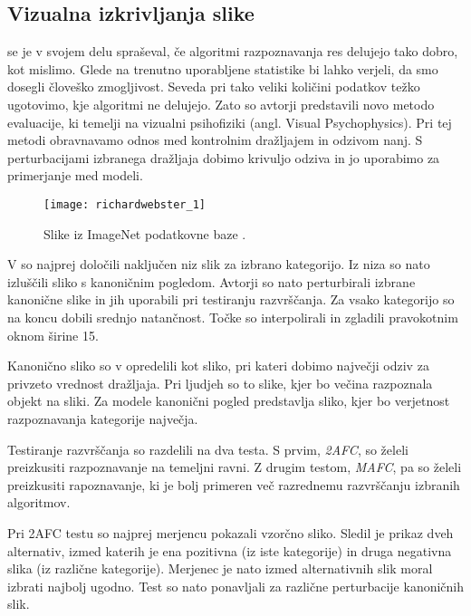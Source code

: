 \subsection{Vizualna izkrivljanja slike} \label{sec:psihofizika}
 se je v svojem delu spraševal, če algoritmi razpoznavanja res delujejo tako dobro, kot mislimo. Glede na trenutno uporabljene statistike bi lahko verjeli, da smo dosegli človeško zmogljivost. Seveda pri tako veliki količini podatkov težko ugotovimo, kje algoritmi ne delujejo. Zato so avtorji predstavili novo metodo evaluacije, ki temelji na vizualni psihofiziki (angl. Visual Psychophysics). Pri tej metodi obravnavamo odnos med kontrolnim dražljajem in odzivom nanj. S perturbacijami izbranega dražljaja dobimo krivuljo odziva in jo uporabimo za primerjanje med modeli. 


\begin{figure}[!htbp]
	\centering
	\texttt{[image: richardwebster\_1]}
	\caption{Slike iz ImageNet podatkovne baze \cite{deng2009imagenet}.}
\end{figure}

V \cite{richardwebster2016psyphy} so najprej določili naključen niz slik za izbrano kategorijo. Iz niza so nato izluščili sliko s kanoničnim pogledom. Avtorji so nato perturbirali izbrane kanonične slike in jih uporabili pri testiranju razvrščanja. Za vsako kategorijo so na koncu dobili srednjo natančnost. Točke so interpolirali in zgladili pravokotnim oknom širine \num{15}. 

Kanonično sliko so v \cite{richardwebster2016psyphy} opredelili kot sliko, pri kateri dobimo največji odziv za privzeto vrednost dražljaja. Pri ljudjeh so to slike, kjer bo večina razpoznala objekt na sliki. Za modele kanonični pogled predstavlja sliko, kjer bo verjetnost razpoznavanja kategorije največja.

Testiranje razvrščanja so razdelili na dva testa. S prvim, \emph{2AFC}, so želeli preizkusiti razpoznavanje na temeljni ravni. Z drugim testom, \emph{MAFC}, pa so želeli preizkusiti rapoznavanje, ki je bolj primeren več razrednemu razvrščanju izbranih algoritmov. 

Pri 2AFC testu so najprej merjencu pokazali vzorčno sliko. Sledil je prikaz dveh alternativ, izmed katerih je ena pozitivna (iz iste kategorije) in druga negativna slika (iz različne kategorije). Merjenec je nato izmed alternativnih slik moral izbrati najbolj ugodno. Test so nato ponavljali za različne perturbacije kanoničnih slik. 


